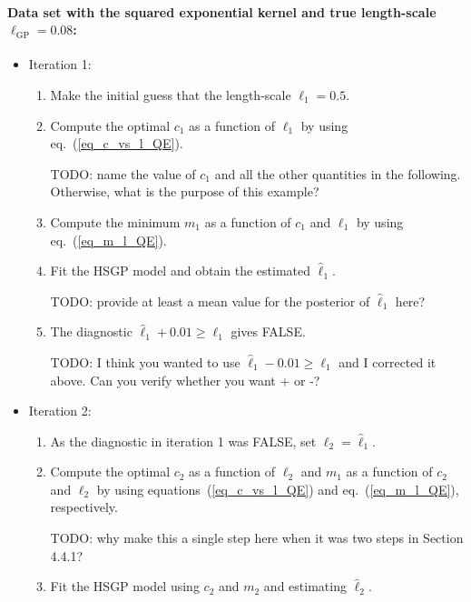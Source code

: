 \paragraph*{Data set with the squared exponential kernel and true length-scale $\ell_{\text{GP}} = 0.08$:} 
\begin{itemize}
\item[] Iteration 1:
	\begin{enumerate}
	\item Make the initial guess that the length-scale $\ell_1=0.5$.
	
	\item Compute the optimal $c_1$ as a function of $\ell_1$ by using eq.~(\ref{eq_c_vs_l_QE}).
	
	TODO: name the value of $c_1$ and all the other quantities in the following. Otherwise, what is the purpose of this example?
	
	\item Compute the minimum $m_1$ as a function of $c_1$ and $\ell_1$ by using eq.~(\ref{eq_m_l_QE}).
	
	\item Fit the HSGP model and obtain the estimated $\hat{\ell}_1$.
	
	TODO: provide at least a mean value for the posterior of  $\hat{\ell}_1$ here?
	
	\item The diagnostic $\hat{\ell}_1 + 0.01 \geq \ell_1$ gives FALSE.
	
	TODO: I think you wanted to use $\hat{\ell}_1 - 0.01 \geq \ell_1$ and I corrected it above. Can you verify whether you want + or -?
	\end{enumerate}
	
\item[] Iteration 2:
	\begin{enumerate}
	\item As the diagnostic in iteration 1 was FALSE, set $\ell_2 = \hat{\ell}_1$.
	
	\item Compute the optimal $c_2$ as a function of $\ell_2$ and $m_1$ as a function of $c_2$ and $\ell_2$ by using equations~(\ref{eq_c_vs_l_QE}) and eq.~(\ref{eq_m_l_QE}), respectively.
	
	TODO: why make this a single step here when it was two steps in Section 4.4.1?
	
	\item Fit the HSGP model using $c_2$ and $m_2$ and estimating $\hat{\ell}_2$.
	

\end{enumerate}
\end{itemize}
